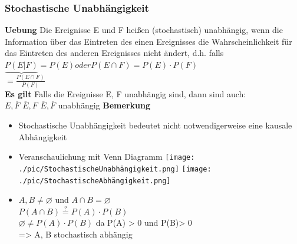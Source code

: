  \subsubsection{Stochastische Unabhängigkeit}
  \textbf{Uebung}
  Die Ereignisse E und F heißen (stochastisch) unabhängig, wenn die Information über das Eintreten des einen Ereignisses die Wahrscheinlichkeit für das Eintreten des anderen Ereignisses nicht ändert, d.h. falls\\
  $\underbrace{P(E|F)}= P(E) oder P(E\cap F) = P(E) \cdot P(F)$\\
  $= \frac{P(E \cap F)}{P(F)}$\\
  \textbf{Es gilt}
  Falls die Ereignisse E, F unabhängig sind, dann sind auch:\\
  \subitem $E, \overline{F}$
  \subitem $\overline{E} , F$
  \subitem $\overline{E}, \overline{F}$
  unabhängig
  \textbf{Bemerkung}
  \begin{itemize}
  	\item Stochastische Unabhängigkeit bedeutet nicht notwendigerweise eine kausale Abhängigkeit
  	\item Veranschaulichung mit Venn Diagramm
  	  \texttt{[image: ./pic/StochastischeUnabhängigkeit.png]}
  	  \texttt{[image: ./pic/StochastischeAbhängigkeit.png]}
  	\item $A, B \ne \varnothing$ und $A \cap B  = \varnothing$\\
  	$P(A\cap B) \stackrel{?}{=} P(A) \cdot P(B)$\\
  	$\varnothing \ne P(A) \cdot P(B)$ da P(A) > 0 und P(B)> 0\\
  	=> A, B stochastisch abhängig
  \end{itemize}
  
  
